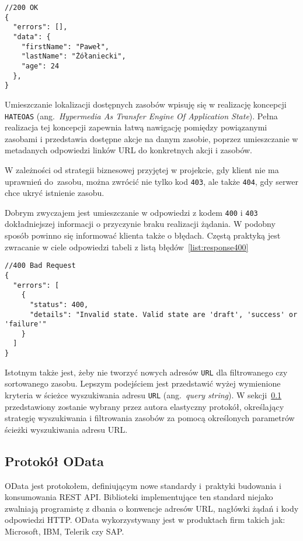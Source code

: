 {\belowcaptionskip=-10pt
\begin{lstlisting}[label=list:response200,
    caption=Przykład pomyślnej odpowiedzi serwera]
//200 OK
{
  "errors": [],
  "data": {
    "firstName": "Paweł",
    "lastName": "Żółaniecki",
    "age": 24
  },
}
\end{lstlisting}
}

Umieszczanie lokalizacji dostępnych zasobów wpisuję się w realizację koncepcji \texttt{HATEOAS} (ang.~\emph{Hypermedia As Transfer Engine Of Application State}). Pełna realizacja tej koncepcji zapewnia łatwą nawigację pomiędzy powiązanymi zasobami i przedstawia dostępne akcje na danym zasobie, poprzez umieszczanie w metadanych odpowiedzi linków URL do konkretnych akcji i zasobów.

W zależności od strategii biznesowej przyjętej w projekcie, gdy klient nie ma uprawnień do~zasobu, można zwrócić nie tylko kod \texttt{403}, ale także \texttt{404}, gdy serwer chce ukryć istnienie zasobu.

Dobrym zwyczajem jest umieszczanie w odpowiedzi z kodem \texttt{400} i \texttt{403} dokładniejszej informacji o przyczynie braku realizacji żądania. W podobny sposób powinno się informować klienta także o błędach. Częstą praktyką jest zwracanie w ciele odpowiedzi tabeli z listą błędów~\ref{list:response400}

{\belowcaptionskip=-10pt
\begin{lstlisting}[label=list:response400,
    caption=Odpowiedź serwera zawierająca opis błędu]
//400 Bad Request
{
  "errors": [
    {
      "status": 400,
      "details": "Invalid state. Valid state are 'draft', 'success' or 'failure'"
    }
  ]
}
\end{lstlisting}
}

Istotnym także jest, żeby nie tworzyć nowych adresów \texttt{URL} dla filtrowanego czy sortowanego zasobu. Lepszym podejściem jest przedstawić wyżej wymienione kryteria w ścieżce wyszukiwania adresu \texttt{URL} (ang.~\emph{query string}). W sekcji~\ref{subsec:odata} przedstawiony zostanie wybrany przez autora elastyczny protokół, określający strategię wyszukiwania i filtrowania zasobów za pomocą określonych parametrów ścieżki wyszukiwania adresu URL.

\subsection{Protokół OData}
\label{subsec:odata}

OData jest protokołem, definiującym nowe standardy i~praktyki budowania i konsumowania REST API. Biblioteki implementujące ten standard niejako zwalniają programistę z dbania o konwencje adresów URL, nagłówki żądań i kody odpowiedzi HTTP. OData wykorzystywany jest w produktach firm takich jak: Microsoft, IBM, Telerik czy SAP.

